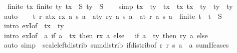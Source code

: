 \begin{isabellebody}
\ {\isacharasterisk}{\kern0pt}{\isacharcolon}{\kern0pt}\ {\isachardoublequoteopen}finite\ tx{\isachardoublequoteclose}\ {\isachardoublequoteopen}finite\ ty{\isachardoublequoteclose}\ {\isachardoublequoteopen}tx\ {\isasymsubseteq}\ S{\isachardoublequoteclose}\ {\isachardoublequoteopen}ty\ {\isasymsubseteq}\ S{\isachardoublequoteclose}\isanewline
\ \ \isamarkupfalse%
\ {\isacharbrackleft}{\kern0pt}simp{\isacharbrackright}{\kern0pt}{\isacharcolon}{\kern0pt}\ {\isachardoublequoteopen}{\isacharparenleft}{\kern0pt}tx\ {\isasymunion}\ ty{\isacharparenright}{\kern0pt}\ {\isasyminter}\ tx\ {\isacharequal}{\kern0pt}\ tx{\isachardoublequoteclose}\ {\isachardoublequoteopen}{\isacharparenleft}{\kern0pt}tx\ {\isasymunion}\ ty{\isacharparenright}{\kern0pt}\ {\isasyminter}\ ty\ {\isacharequal}{\kern0pt}\ ty{\isachardoublequoteclose}\isanewline
\ \ \ \ \isamarkupfalse%
\ auto\isanewline
\ \ \isamarkupfalse%
\ {\isachardoublequoteopen}{\isasymexists}t\ r{\isachardot}{\kern0pt}\ {\isacharparenleft}{\kern0pt}{\isasymSum}a{\isasymin}tx{\isachardot}{\kern0pt}\ rx\ a\ {\isacharasterisk}{\kern0pt}s\ a{\isacharparenright}{\kern0pt}\ {\isacharplus}{\kern0pt}\ {\isacharparenleft}{\kern0pt}{\isasymSum}a{\isasymin}ty{\isachardot}{\kern0pt}\ ry\ a\ {\isacharasterisk}{\kern0pt}s\ a{\isacharparenright}{\kern0pt}\ {\isacharequal}{\kern0pt}\ {\isacharparenleft}{\kern0pt}{\isasymSum}a{\isasymin}t{\isachardot}{\kern0pt}\ r\ a\ {\isacharasterisk}{\kern0pt}s\ a{\isacharparenright}{\kern0pt}\ {\isasymand}\ finite\ t\ {\isasymand}\ t\ {\isasymsubseteq}\ S{\isachardoublequoteclose}\isanewline
\ \ \ \ \isamarkupfalse%
\ {\isacharparenleft}{\kern0pt}intro\ exI{\isacharbrackleft}{\kern0pt}of\ {\isacharunderscore}{\kern0pt}\ {\isachardoublequoteopen}tx\ {\isasymunion}\ ty{\isachardoublequoteclose}{\isacharbrackright}{\kern0pt}{\isacharparenright}{\kern0pt}\isanewline
\ \ \ \ \isamarkupfalse%
\ {\isacharparenleft}{\kern0pt}intro\ exI{\isacharbrackleft}{\kern0pt}of\ {\isacharunderscore}{\kern0pt}\ {\isachardoublequoteopen}{\isasymlambda}a{\isachardot}{\kern0pt}\ {\isacharparenleft}{\kern0pt}if\ a\ {\isasymin}\ tx\ then\ rx\ a\ else\ {}{\isacharparenright}{\kern0pt}\ {\isacharplus}{\kern0pt}\ {\isacharparenleft}{\kern0pt}if\ a\ {\isasymin}\ ty\ then\ ry\ a\ else\ {}{\isacharparenright}{\kern0pt}{\isachardoublequoteclose}{\isacharbrackright}{\kern0pt}{\isacharparenright}{\kern0pt}\isanewline
\ \ \ \ \isamarkupfalse%
\ {\isacharparenleft}{\kern0pt}auto\ simp{\isacharcolon}{\kern0pt}\ {\isacharasterisk}{\kern0pt}\ scale{\isacharunderscore}{\kern0pt}left{\isacharunderscore}{\kern0pt}distrib\ sum{\isachardot}{\kern0pt}distrib\ if{\isacharunderscore}{\kern0pt}distrib{\isacharbrackleft}{\kern0pt}of\ {\isachardoublequoteopen}{\isasymlambda}r{\isachardot}{\kern0pt}\ r\ {\isacharasterisk}{\kern0pt}s\ a{\isachardoublequoteclose}\ \ a{\isacharbrackright}{\kern0pt}\ sum{\isachardot}{\kern0pt}If{\isacharunderscore}{\kern0pt}cases{\isacharparenright}{\kern0pt}\isanewline

\end{isabellebody}
